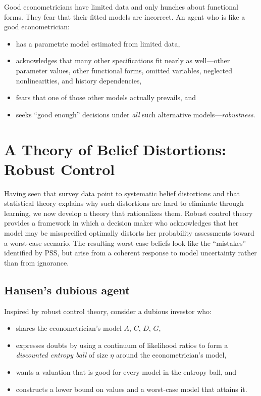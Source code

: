 \documentclass[12pt]{article}
\theoremstyle{definition}
\begin{document}
Good econometricians have limited data and only hunches about functional
forms.  They fear that their fitted models are incorrect.  An agent who
is like a good econometrician:
\begin{itemize}
\item has a parametric model estimated from limited data,
\item acknowledges that many other specifications fit nearly as
      well---other parameter values, other functional forms, omitted
      variables, neglected nonlinearities, and history dependencies,
\item fears that one of those other models actually prevails, and
\item seeks ``good enough'' decisions under \emph{all} such alternative
      models---\emph{robustness}.
\end{itemize}


\section{A Theory of Belief Distortions: Robust Control}
\label{sec:robust}

Having seen that survey data point to systematic belief distortions and
that statistical theory explains why such distortions are hard to
eliminate through learning, we now develop a theory that rationalizes
them.  Robust control theory provides a framework in which a decision
maker who acknowledges that her model may be misspecified optimally
distorts her probability assessments toward a worst-case scenario.  The
resulting worst-case beliefs look like the ``mistakes'' identified by
PSS, but arise from a coherent response to model uncertainty rather than
from ignorance.

\subsection{Hansen's dubious agent}

Inspired by robust control theory, consider a dubious investor who:
\begin{itemize}
\item shares the econometrician's model $A$, $C$, $D$, $G$,
\item expresses doubts by using a continuum of likelihood ratios to form
      a \emph{discounted entropy ball} of size $\eta$ around the
      econometrician's model,
\item wants a valuation that is good for every model in the entropy
      ball, and
\item constructs a lower bound on values and a worst-case model that
      attains it.
\end{itemize}
\end{document}
